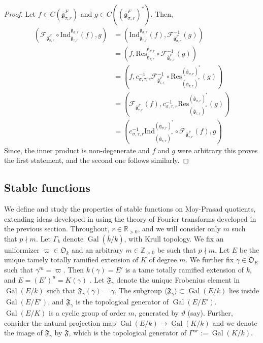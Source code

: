\documentclass[11 pt]{article}
\numberwithin{equation}{subsection}
\theoremstyle{definition}
\theoremstyle{remark}
\theoremstyle{conjecture}
\DeclareMathOperator{\Gal}{Gal}
\newcommand{\bg}{\bar{\mathfrak g}}
\newcommand{\Ind}{\mathrm{Ind}}
\newcommand{\Z}{\mathbb Z}
\newcommand{\R}{\mathbb R}
\newcommand{\mcF}{\mathcal F}
\newcommand{\mf}{\mathfrak}
\begin{document}
\begin{proof}
    Let $f \in C(\bg_{\tau,r}^F)$ and $g \in C((\bg_{\sigma,r}^F)^*)$. Then,  
    \begin{align*}
        (\mcF_{\bg_{\sigma,r}^F} \circ \Ind^{\bg_{\sigma,r}}_{\bg_{\tau,r}}(f),g)&=(\Ind^{\bg_{\sigma,r}}_{\bg_{\tau,r}}(f), \mcF_{\bg_{\sigma,r}^F}^{-1}(g))\\
        &=(f, \mathrm{Res}^{\bg_{\sigma,r}}_{\bg_{\tau,r}}\circ \mcF_{\bg_{\sigma,r}^F}^{-1}(g))\\
        &=(f, c_{\sigma,\tau,r}^{-1}\mcF_{\bg_{\tau,r}^F}^{-1}\circ \mathrm{Res}^{(\bg_{\sigma,r})^*}_{(\bg_{\tau,r})^*}(g))\\
        &= (\mcF_{\bg_{\tau,r}^F}(f), c_{\sigma,\tau,r}^{-1}\mathrm{Res}^{(\bg_{\sigma,r})^*}_{(\bg_{\tau,r})^*}(g))\\
        &=(c_{\sigma,\tau,r}^{-1}\Ind^{(\bg_{\sigma,r})^*}_{(\bg_{\tau,r})^*}\circ\mcF_{\bg_{\tau,r}^F}(f), g)
    \end{align*}
    Since, the inner product is non-degenerate and $f$ and $g$ were arbitrary this proves the first statement, and the second one follows similarly. 
\end{proof}



\subsection{Stable functions}\label{subsectionstablefunction}
We define and study the properties of stable functions on Moy-Prasad quotients, extending ideas developed in \cite{cb24} using the theory of Fourier transforms developed in the previous section. Throughout, $r \in \R_{>0}$, and we will consider only $m$ such that $p \nmid m$. Let $\Gamma_k$ denote $\Gal(\bar k/k)$, with Krull topology. We fix an uniformizer $\varpi \in \mf O_{k}$ and an arbitrary $m \in \Z_{>0}$ be such that $p \nmid m$. Let $E$ be the unique tamely totally ramified extension of $K$ of degree $m$. We further fix $\gamma \in \mf O_{E}$ such that $\gamma^m=\varpi$. Then $k(\gamma)=E'$ is a tame totally ramified extension of $k$, and $E=(E')^{u}= K(\gamma)$ . Let $\mf F_\gamma$ denote the unique Frobenius element in $\Gal(E/k)$ such that $\mf F_\gamma(\gamma)=\gamma$. The subgroup $\langle \mf F_\gamma\rangle \subset \Gal(E/k)$ lies inside  $\Gal(E/E')$, and $\mf F_\gamma$ is the topological generator of $\Gal(E/E')$. $\Gal(E/K)$ is a cyclic group of order $m$, generated by $\vartheta$ (say). Further, consider the natural projection map $\Gal(E/k) \longrightarrow \Gal(K/k)$ and we denote the image of $\mf F_\gamma$ by $\mf F$, which is the topological generator of $\Gamma^{ur}:=\Gal(K/k)$.\paragraph{} 
\end{document}

